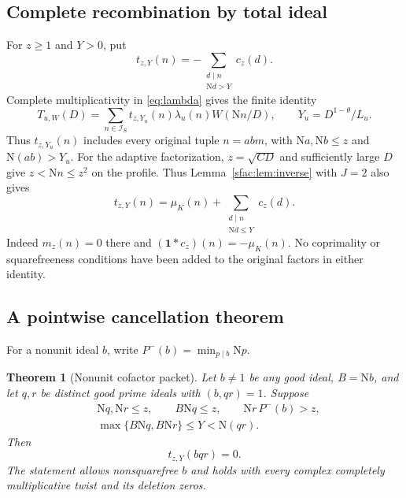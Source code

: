 \documentclass[11pt]{article}
\numberwithin{equation}{section}
\newtheorem{theorem}{Theorem}[section]
\theoremstyle{definition}
\theoremstyle{remark}
\newcommand{\N}{\mathrm N}
\newcommand{\muK}{\mu_K}
\newcommand{\good}{\mathcal I_S}
\begin{document}
\subsection{Complete recombination by total ideal}

For $z\ge1$ and $Y>0$, put
\begin{equation}\label{eq:packet-coefficient}
 t_{z,Y}(n)=-\sum_{\substack{d\mid n\\\N d>Y}}c_z(d).
\end{equation}
Complete multiplicativity in \eqref{eq:lambda} gives the finite identity
\begin{equation}\label{eq:packet-recombination}
 T_{u,W}(D)=\sum_{n\in\good}
   t_{z,Y_u}(n)\lambda_u(n)W(\N n/D),
 \qquad Y_u=D^{1-\theta}/L_u.
\end{equation}
Thus $t_{z,Y_u}(n)$ includes every original tuple $n=abm$,
with $\N a,\N b\le z$ and $\N(ab)>Y_u$.
For the adaptive factorization, $z=\sqrt{CD}$ and sufficiently large
$D$ give $z<\N n\le z^2$ on the profile. Thus
Lemma~\ref{sfac:lem:inverse} with $J=2$
also gives
\begin{equation}\label{eq:packet-inverse-coefficient}
 t_{z,Y}(n)=\muK(n)+\sum_{\substack{d\mid n\\\N d\le Y}}c_z(d).
\end{equation}
Indeed $m_z(n)=0$ there and $(\mathbf1*c_z)(n)=-\muK(n)$.
No coprimality or squarefreeness conditions have been added to the
original factors in either identity.

\subsection{A pointwise cancellation theorem}

For a nonunit ideal $b$, write
$P^-(b)=\min_{p\mid b}\N p$.

\begin{theorem}[Nonunit cofactor packet]
\label{thm:divisor-packet}
Let $b\ne1$ be any good ideal, $B=\N b$, and let $q,r$ be
distinct good prime ideals with $(b,qr)=1$. Suppose
\begin{align}
 &\N q,\N r\le z,\qquad B\N q\le z,
       \qquad \N r\,P^-(b)>z,\label{eq:packet-factor-conditions}\\
 &\max\{B\N q,B\N r\}\le Y<\N(qr).
       \label{eq:packet-tail-conditions}
\end{align}
Then
\begin{equation}\label{eq:packet-zero}
 t_{z,Y}(bqr)=0.
\end{equation}
The statement allows nonsquarefree $b$ and holds with every complex
completely multiplicative twist and its deletion zeros.
\end{theorem}
\end{document}
